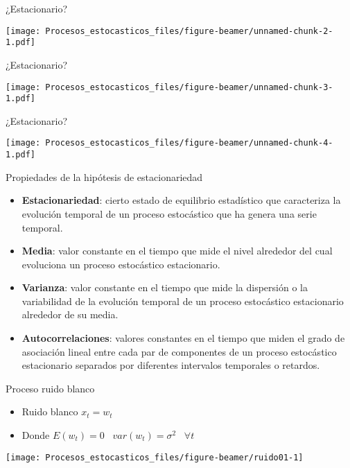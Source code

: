 \documentclass[ignorenonframetext,]{beamer}
\begin{document}
\begin{frame}{¿Estacionario?}

\texttt{[image: Procesos\_estocasticos\_files/figure-beamer/unnamed-chunk-2-1.pdf]}

\end{frame}

\begin{frame}{¿Estacionario?}

\texttt{[image: Procesos\_estocasticos\_files/figure-beamer/unnamed-chunk-3-1.pdf]}

\end{frame}

\begin{frame}{¿Estacionario?}

\texttt{[image: Procesos\_estocasticos\_files/figure-beamer/unnamed-chunk-4-1.pdf]}

\end{frame}

\begin{frame}{Propiedades de la hipótesis de estacionariedad}

\begin{itemize}
\item
  {\textbf{Estacionariedad}}: cierto estado de equilibrio estadístico
  que caracteriza la evolución temporal de un proceso estocástico que ha
  genera una serie temporal.
\item
  {\textbf{Media}}: valor constante en el tiempo que mide el nivel
  alrededor del cual evoluciona un proceso estocástico estacionario.
\item
  {\textbf{Varianza}}: valor constante en el tiempo que mide la
  dispersión o la variabilidad de la evolución temporal de un proceso
  estocástico estacionario alrededor de su media.
\item
  {\textbf{Autocorrelaciones}}: valores constantes en el tiempo que
  miden el grado de asociación lineal entre cada par de componentes de
  un proceso estocástico estacionario separados por diferentes
  intervalos temporales o retardos.
\end{itemize}

\end{frame}

\begin{frame}{Proceso ruido blanco}

\begin{itemize}
\item
  Ruido blanco \(x_t = w_t\)
\item
  Donde \(E(w_t)=0\;\;\; var(w_t)=\sigma^2 \;\;\; \forall t\)
\end{itemize}

\begin{center}\texttt{[image: Procesos\_estocasticos\_files/figure-beamer/ruido01-1]} \end{center}

\end{frame}
\end{document}
